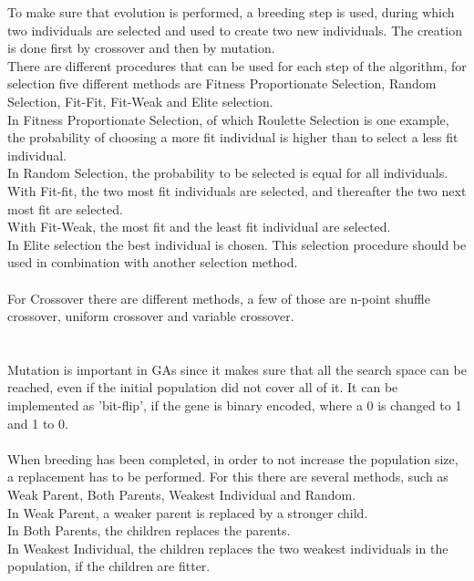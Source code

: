 To make sure that evolution is performed, a breeding step is used, during which two individuals are selected and used to create two new individuals. The creation is done first by crossover and then by mutation.\\
There are different procedures that can be used for each step of the algorithm, for selection five different methods are Fitness Proportionate Selection, Random Selection, Fit-Fit, Fit-Weak and Elite selection.\\
In Fitness Proportionate Selection, of which Roulette Selection is one example, the probability of choosing a more fit individual is higher than to select a less fit individual.\\
In Random Selection, the probability to be selected is equal for all individuals. \\
With Fit-fit, the two most fit individuals are selected, and thereafter the two next most fit are selected.\\
With Fit-Weak, the most fit and the least fit individual are selected.\\
In Elite selection the best individual is chosen. This selection procedure should be used in combination with another selection method.\\
\\
For Crossover there are different methods, a few of those are n-point shuffle crossover, uniform crossover and variable crossover.\\
\\
\\Mutation is important in GAs since it makes sure that all the search space can be reached, even if the initial population did not cover all of it. It can be implemented as 'bit-flip', if the gene is binary encoded, where a 0 is changed to 1 and 1 to 0.\\
\\
When breeding has been completed, in order to not increase the population size, a replacement has to be performed. For this there are several methods, such as Weak Parent, Both Parents, Weakest Individual and Random.\\
In Weak Parent, a weaker parent is replaced by a stronger child.\\
In Both Parents, the children replaces the parents.\\
In Weakest Individual, the children replaces the two weakest individuals in the population, if the children are fitter.\\
